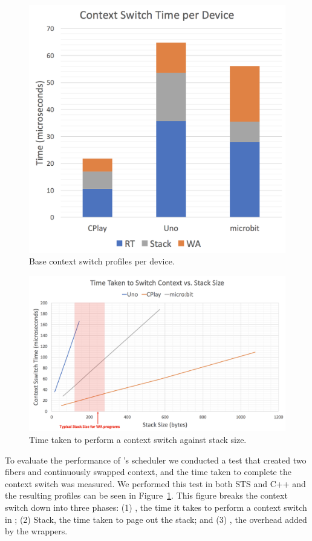 \begin{figure}[ht]
    \includegraphics[width=.7\columnwidth]{images/context-switch.png}
\caption{\label{fig:context-switch}Base context switch profiles per device.}
\end{figure}

\begin{figure}[ht]
    \includegraphics[width=.99\columnwidth]{images/context-vs-stack.png}
\caption{\label{fig:context-vs-stack}Time taken to perform a context switch against stack size.}
\end{figure}

To evaluate the performance of \CON's scheduler we conducted a test that created two fibers and continuously swapped context,
and the time taken to complete the context switch was measured. 
We performed this test in both STS and C++ and the resulting profiles can be seen in Figure~\ref{fig:context-switch}. 
This figure breaks the context switch down into three phases: 
(1) \CO, the time it takes to perform a context switch in \CO; 
(2) Stack, the time taken to page out the \MC stack; and 
(3) \MC, the overhead added by the \MC wrappers. 

